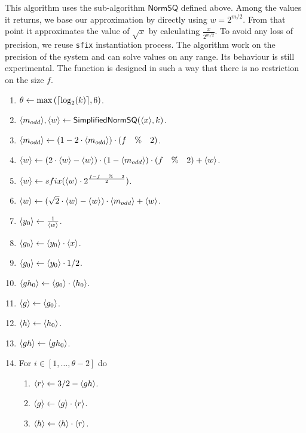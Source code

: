 This algorithm uses the sub-algorithm $\mathsf{NormSQ}$ defined above. Among the values it returns, we base our approximation by directly using $w =2^{m/2}$. From that point it approximates the  value of $\sqrt{x}$ by calculating $\frac{x}{2^{m/2}}$. To avoid any loss of precision, we reuse \verb|sfix| instantiation process.
The algorithm work on the precision of the system and can solve values on any range. Its behaviour is still experimental. The function is designed in such a way that there is no restriction on the size $f$.
\begin{enumerate}
  \item $\theta \leftarrow \max{({\lceil \log_2(k) \rceil},6)}$.
  \item $\langle m_{odd} \rangle, \langle w \rangle \leftarrow \mathsf{SimplifiedNormSQ}(\langle x \rangle,k)$.
  \item $\langle m_{odd} \rangle \leftarrow (1 - 2 \cdot \langle m_{odd} \rangle) \cdot (f \quad \% \quad 2)$.
  \item $\langle w \rangle \leftarrow (2 \cdot \langle w \rangle -\langle w \rangle) \cdot (1 - \langle m_{odd} \rangle) \cdot (f \quad \% \quad 2) + \langle w \rangle$.
  \item $\langle w \rangle \leftarrow sfix( \langle w \rangle \cdot 2 ^{\frac{f - f \quad \% \quad 2}{2}})$.
  \item $\langle w \rangle \leftarrow (\sqrt{2}\cdot \langle w \rangle - \langle w \rangle)\cdot \langle m_{odd} \rangle + \langle w \rangle$.
  \item $\langle y_0 \rangle \leftarrow \frac{1}{\langle w \rangle} $.
  \item $\langle g_0 \rangle \leftarrow \langle y_0 \rangle \cdot \langle x \rangle$.
  \item $\langle g_0 \rangle \leftarrow \langle y_0 \rangle \cdot 1/2$.
  \item $\langle gh_0 \rangle \leftarrow \langle g_0 \rangle \cdot \langle h_0 \rangle$.
  \item $\langle g \rangle \leftarrow \langle g_0 \rangle$.
  \item $\langle h \rangle \leftarrow \langle h_0 \rangle$.
  \item $\langle gh \rangle \leftarrow \langle gh_0 \rangle$.
  \item For $i \in[1,\ldots,\theta-2]$ do
        \begin{enumerate}
          \item $\langle r \rangle \leftarrow 3/2-\langle gh \rangle$.
          \item $\langle g \rangle \leftarrow \langle g \rangle \cdot \langle r \rangle$.
          \item $\langle h \rangle \leftarrow \langle h \rangle \cdot \langle r \rangle$.

\end{enumerate}
\end{enumerate}
